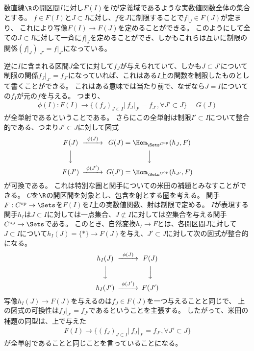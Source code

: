 \documentclass[uplatex]{jsarticle}
\begin{document}
\begin{eg}
数直線$\R$の開区間$I$に対し$F(I)$を$I$が定義域であるような実数値関数全体の集合とする。
$f \in F(I)$と$J\subset I$に対し、$f$を$J$に制限することで$f\vert_J \in F(J)$が定まり、
これにより写像$F(I) \to F(J)$を定めることができる。
このようにして全ての$J \subset I$に対して一斉に$f\vert_J$を定めることができ、しかもこれらは互いに制限の関係$(f\vert_J)\vert_{J'}=f\vert_{J'}$になっている。

逆に$I$に含まれる区間$J$全てに対して$f_J$が与えられていて、しかも$J\subset J'$について制限の関係$f_J\vert_{J'}=f_{J'}$になっていれば、これはある$I$上の関数を制限したものとして書くことができる。
これはある意味では当たり前で、なぜなら$J=I$についての$f_I$が元の$f$を与える。
つまり、
\begin{align*}
\phi(I):F(I) \to \{(f_J)_{J\subset I}\vert~ f_J\vert_{J'} = f_{J'}, \forall J' \subset J\}=G(J)
\end{align*}
が全単射であるということである。
さらにこの全単射は制限$I'\subset I$について整合的である、つまり$J'\subset J$に対して図式
\[
\begin{CD}
F(J)@>\phi(J)>>G(J)=\Hom_{\Sets^{C^{\rm op}}}(h_J,F)\\
@VVV@VVV\\
F(J')@>\phi(J')>>G(J')=\Hom_{\Sets^{C^{\rm op}}}(h_{J'},F)
\end{CD}
\]
が可換である。
これは特別な圏と関手についての米田の補題とみなすことができる。
$C$を$\R$の開区間を対象とし、包含を射とする圏を考える。
関手$F:C^{\rm op} \to \Sets$を$F(I)$を$I$上の実数値関数、射は制限で定める。
$I$が表現する関手$h_I$は$J \subset I$に対しては一点集合、$J \not\subset I$に対しては空集合を与える関手$C^{\rm op} \to \Sets$である。
このとき、自然変換$h_I \to F$とは、各開区間$J$に対して$J \subset I$について$h_I(J)=\{*\} \to F(J)$を与え、$J'\subset J$に対して次の図式が整合的になる。
\[
\begin{CD}
h_I(J)@>\phi(J)>>F(J)\\
@VVV@VVV\\
h_I(J')@>\phi(J')>>F(J')
\end{CD}
\]
写像$h_I(J) \to F(J)$を与えるのは$f_J\in F(J)$を一つ与えることと同じで、
上の図式の可換性は$f_J\vert_{J'}=f_{J'}$であるということを主張する。
したがって、米田の補題の同型は、上で与えた
\begin{align*}
F(I) \to \{(f_J)_{J\subset I}\vert~ f_J\vert_{J'} = f_{J'}, \forall J' \subset J\}
\end{align*}
が全単射であることと同じことを言っていることになる。
\end{eg}
\end{document}
